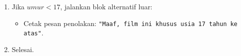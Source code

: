 \documentclass[12pt,a4paper]{article}
\begin{document}
\begin{enumerate}
\begin{enumerate}[label=\alph*.]
\begin{enumerate}[label=\roman*.]
\begin{itemize}
            \end{itemize}
            \item Selain itu:
            \begin{itemize}
                \item Cetak \texttt{"Tiket: harga umum Rp45000"}.
            \end{itemize}
        \end{enumerate}
        \item Jika $umur < 17$, jalankan blok alternatif luar:
        \begin{itemize}
            \item Cetak pesan penolakan: \texttt{"Maaf, film ini khusus usia 17 tahun ke atas"}.
        \end{itemize}
        \item Selesai.
    \end{enumerate}
\end{enumerate}
\end{document}
